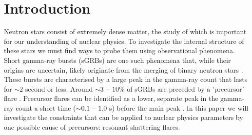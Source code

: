 \documentclass[fleqn,usenatbib]{mnras}
\begin{document}



 


\section{Introduction}
\hspace{\parindent}Neutron stars consist of extremely dense matter, the study of which is important for our understanding of nuclear physics. To investigate the internal structure of these stars we must find ways to probe them using observational phenomena. Short gamma-ray bursts (sGRBs) \citet{d2015short} are one such phenomena that, while their origins are uncertain, likely originate from the merging of binary neutron stars \citet{eichler1989nucleosynthesis}. These bursts are characterised by a large peak in the gamma-ray count that lasts for $\sim 2$ second or less. Around $\sim3-10$\% of sGRBs are preceded by a 'precursor' flare \citep{zhong2019precursors,troja2010precursors}. Precursor flares can be identified as a lower, separate peak in the gamma-ray count a short time ($\sim 0.1-1.0$ s) before the main peak \citet{zhong2019precursors}. In this paper we will investigate the constraints that can be applied to nuclear physics parameters by one possible cause of precursors: resonant shattering flares.
\end{document}
